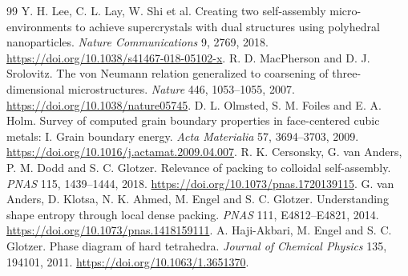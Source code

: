 \documentclass[11pt,a4paper]{article}
\begin{document}
\begin{thebibliography}{99}
 Y. H. Lee, C. L. Lay, W. Shi et al. Creating two self-assembly micro-environments to achieve supercrystals with dual structures using polyhedral nanoparticles. \emph{Nature Communications} 9, 2769, 2018. \url{https://doi.org/10.1038/s41467-018-05102-x}.
 R. D. MacPherson and D. J. Srolovitz. The von Neumann relation generalized to coarsening of three-dimensional microstructures. \emph{Nature} 446, 1053--1055, 2007. \url{https://doi.org/10.1038/nature05745}.
 D. L. Olmsted, S. M. Foiles and E. A. Holm. Survey of computed grain boundary properties in face-centered cubic metals: I. Grain boundary energy. \emph{Acta Materialia} 57, 3694--3703, 2009. \url{https://doi.org/10.1016/j.actamat.2009.04.007}.
 R. K. Cersonsky, G. van Anders, P. M. Dodd and S. C. Glotzer. Relevance of packing to colloidal self-assembly. \emph{PNAS} 115, 1439--1444, 2018. \url{https://doi.org/10.1073/pnas.1720139115}.
 G. van Anders, D. Klotsa, N. K. Ahmed, M. Engel and S. C. Glotzer. Understanding shape entropy through local dense packing. \emph{PNAS} 111, E4812--E4821, 2014. \url{https://doi.org/10.1073/pnas.1418159111}.
 A. Haji-Akbari, M. Engel and S. C. Glotzer. Phase diagram of hard tetrahedra. \emph{Journal of Chemical Physics} 135, 194101, 2011. \url{https://doi.org/10.1063/1.3651370}.
\end{thebibliography}
\end{document}
